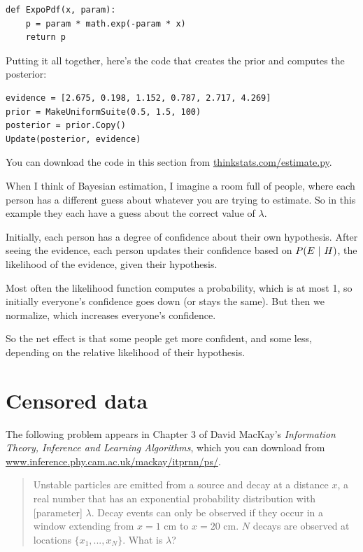 \documentclass[12pt]{book}
\begin{document}
\begin{verbatim}
def ExpoPdf(x, param):
    p = param * math.exp(-param * x)
    return p
\end{verbatim}

Putting it all together, here's the code that creates the prior
and computes the posterior:

\begin{verbatim}
evidence = [2.675, 0.198, 1.152, 0.787, 2.717, 4.269]
prior = MakeUniformSuite(0.5, 1.5, 100)
posterior = prior.Copy()
Update(posterior, evidence)
\end{verbatim}

You can download the code in this section from
\url{thinkstats.com/estimate.py}.


When I think of Bayesian estimation, I imagine a room full of people,
where each person has a different guess about whatever you are trying
to estimate.  So in this example they each have a guess about the
correct value of $\lambda$.

Initially, each person has a degree of confidence about their own hypothesis.
After seeing the evidence, each person updates their confidence based on
$P(E ~|~ H)$, the likelihood of the evidence, given their hypothesis.

Most often the likelihood function computes a
probability, which is at most 1, so initially everyone's confidence
goes down (or stays the same).  But then we normalize, which increases
everyone's confidence.

So the net effect is that some people get more confident, and some less,
depending on the relative likelihood of their hypothesis.


\section{Censored data}
\label{censored}


The following problem appears in Chapter 3 of David MacKay's
{\em Information Theory, Inference and Learning
  Algorithms}, which you can download from
\url{www.inference.phy.cam.ac.uk/mackay/itprnn/ps/}.

\begin{quote}


Unstable particles are emitted from a source and decay at a distance
$x$, a real number that has an exponential probability distribution
with [parameter] $\lambda$.  Decay events can
only be observed if they occur in a window extending from $x=1$ cm to
$x=20$ cm.  $N$ decays are observed at locations $\{ x_1, ... , x_N
\}$.  What is $\lambda$?

\end{quote}
\end{document}
